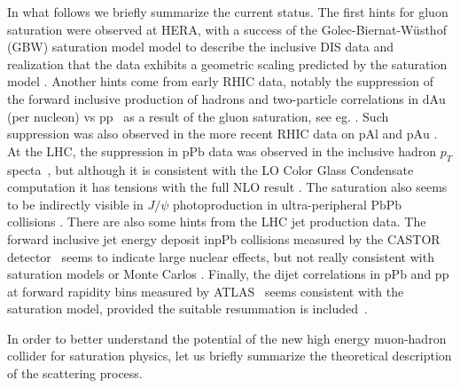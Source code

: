 \documentclass[a4paper,11pt]{article}
\begin{document}
In what follows we briefly summarize the current status. The first hints for gluon saturation were observed at HERA, with a success of the Golec-Biernat-W\"usthof (GBW) saturation model model to describe the inclusive DIS data \cite{Golec-Biernat:1998zce} and realization that the data exhibits a geometric scaling predicted by the saturation model \cite{Stasto:2000er}. 
Another hints come from early RHIC data, notably the suppression of the forward inclusive production of hadrons and two-particle correlations in $\mathrm{dAu}$ (per nucleon) vs $\mathrm{pp}$~\cite{BRAHMS:2004xry,STAR:2006dgg,PHENIX:2011puq} as a result of the gluon saturation, see eg. \cite{Kharzeev:2002ei,Jalilian-Marian:2005ccm,Dumitru:2005gt,Albacete:2010pg}. Such suppression was also observed in the more recent RHIC data on $\mathrm{pAl}$ and $\mathrm{pAu}$ \cite{STAR:2021fgw,Chu:2021hda}. At the LHC, the suppression in $\mathrm{pPb}$ data was observed in the inclusive hadron $p_T$ specta~\cite{LHCb:2022tjh,LHCb:2023kqs}, but although it is consistent with the LO Color Glass Condensate computation \cite{Lappi:2013zma} it has tensions with the full NLO result \cite{Mantysaari:2023vfh}. The saturation also seems to be indirectly visible \cite{Penttala:2024hvp} in $J/\psi$ photoproduction in ultra-peripheral $\mathrm{PbPb}$ collisions \cite{ALICE:2021gpt,ALICE:2023jgu,CMS:2023snh,ALICE:2014eof,LHCb:2014acg,ALICE:2018oyo,LHCb:2018rcm}. 
There are also some hints from the LHC jet production data. The forward inclusive jet energy deposit in$\mathrm{pPb}$ collisions measured by the CASTOR detector~\cite{CMS:2018yhi} seems to indicate large nuclear effects, but not really consistent with saturation models or Monte Carlos \cite{Bury:2017xwd,Mantysaari:2019nnt,Liu:2022ijp}. Finally, the dijet correlations in $\mathrm{pPb}$ and $\mathrm{pp}$ at forward rapidity bins measured by ATLAS~\cite{ATLAS:2019jgo} seems  consistent with the saturation model, provided the suitable resummation is included~\cite{vanHameren:2019ysa}.

In order to better understand the potential of the new high energy muon-hadron collider for saturation physics, let us briefly summarize the theoretical description of the scattering process.
\end{document}
